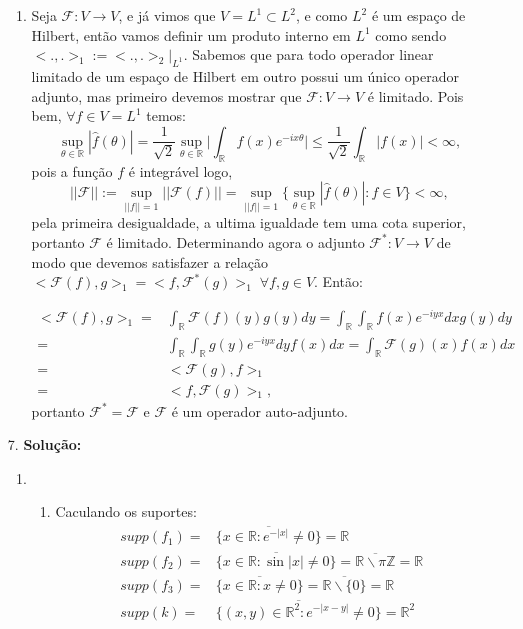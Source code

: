 \documentclass{article}
\begin{document}
\begin{enumerate}
\begin{enumerate}
				\item Seja $\mathcal{F}:V \to V$, e já vimos que $V = L^{1} \subset L^{2}$, e como $L^{2}$ é um espaço de Hilbert, então vamos definir um produto interno em $L^{1}$ como sendo $<.,.>_{1} := <.,.>_{2}|_{L^{1}}$. Sabemos que para todo operador linear limitado de um espaço de Hilbert em outro possui um único operador adjunto, mas primeiro devemos mostrar que $\mathcal{F}:V \to V$ é limitado. Pois bem, $\forall f \in V = L^{1}$ temos:
				$$
				\sup_{\theta \in \mathbb{R}} |\hat{f}(\theta)|
				= \frac{1}{\sqrt{2}}\sup_{\theta \in \mathbb{R}} \Big| \int_{\mathbb{R}}f(x)e^{-ix\theta} \Big| \leq \frac{1}{\sqrt{2}} \int_{\mathbb{R}}|f(x)| <\infty, 
				$$
				pois a função $f$ é integrável logo,
				$$
				||\mathcal{F}|| 
				:= \sup_{||f||=1}||\mathcal{F}(f)|| = \sup_{||f||=1} \Big \{ \sup_{\theta \in \mathbb{R}} |\hat{f}(\theta)|: f \in V \Big \} < \infty,
				$$
				pela primeira desigualdade, a ultima igualdade tem uma cota superior, portanto $\mathcal{F}$ é limitado. Determinando agora o adjunto $\mathcal{F}^{*} :  V \to V$ de modo que devemos satisfazer a relação $<\mathcal{F}(f), g>_{1} = <f, \mathcal{F}^{*}(g)>_{1}\; \forall f, g \in V$. Então:
				
				$$
				\begin{aligned}
				<\mathcal{F}(f), g>_{1} 
				= & \int_{\mathbb{R}} \mathcal{F}(f)(y)g(y)dy = \int_{\mathbb{R}} \int_{\mathbb{R}} f(x)e^{-iyx} dx g(y) dy  \\
				= & \int_{\mathbb{R}} \int_{\mathbb{R}}g(y)e^{-iyx}  dy f(x) dx = \int_{\mathbb{R}} \mathcal{F}(g)(x) f(x) dx \\
				= & <\mathcal{F}(g), f>_{1} \\
				= & <f, \mathcal{F}(g)>_{1},
				\end{aligned}
				$$
				portanto $\mathcal{F}^{*} = \mathcal{F}$ e $\mathcal{F}$ é um operador auto-adjunto.
				\end{enumerate}
		
		\item[7.] \textbf{Solução:} 
			\begin{enumerate}
				\item 
				\begin{enumerate}
					\item Caculando os suportes:
					$$
					\begin{aligned}
					supp(f_{1}) = & \overline{ \{x \in \mathbb{R}: e^{-|x|} \neq 0\} } = \mathbb{R} \\ 
					supp(f_{2}) = & \overline{ \{x \in \mathbb{R}: \sin{|x|} \neq 0\} } = \overline{\mathbb{R} \backslash \pi \mathbb{Z} } = \mathbb{R}\\ 
					supp(f_{3}) = & \overline{ \{x \in \mathbb{R}: x \neq 0\} } = \overline{ \mathbb{R}\backslash \{0\} } = \mathbb{R} \\
					supp(k) = & \overline{ \{(x,y) \in \mathbb{R}^{2}: e^{-|x-y|} \neq 0\} } = \mathbb{R}^{2}
					\end{aligned}
					$$
					

\end{enumerate}
\end{enumerate}
\end{enumerate}
\end{document}
